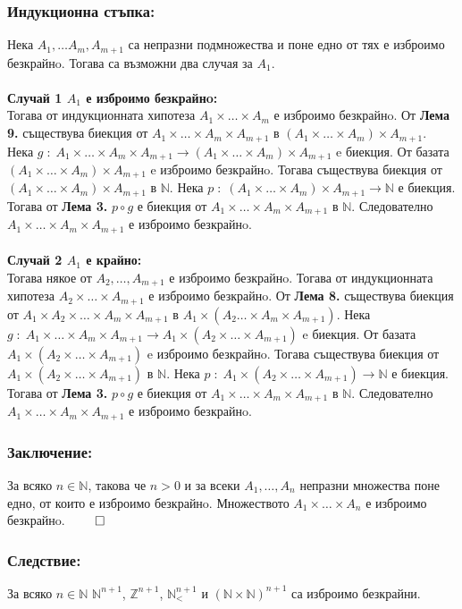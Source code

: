\documentclass[a4paper, 12pt, oneside]{article}
\newcommand{\N}{\mathbb{N}}
\newcommand{\Z}{\mathbb{Z}}
\newcommand{\LN}{\N_<}
\begin{document}
\subsubsection*{Индукционна стъпка:}
Нека \(A_1, \dots A_m, A_{m + 1}\) са непразни подмножества
и поне едно от тях е изброимо безкрайнo.
Тогава са възможни два случая за \(A_1\). \\
\hfill \\
\medskip
\textbf{Случай 1 \(A_1\) е изброимо безкрайнo:} \\
Тогава от индукционната хипотеза \(A_1 \times \dots \times A_m\) е изброимо безкрайнo.
От \textbf{Лема 9.} съществува биекция
от \(A_1 \times \dots \times A_m \times A_{m + 1}\) в \((A_1 \times \dots \times A_m) \times A_{m + 1}\). \\
Нека \(g \; : \; A_1 \times \dots \times A_m \times A_{m + 1} \to (A_1 \times \dots \times A_m) \times A_{m + 1}\)
e биекция.
От базата \((A_1 \times \dots \times A_m) \times A_{m + 1}\) e изброимо безкрайнo.
Тогава съществува биекция от \((A_1 \times \dots \times A_m) \times A_{m + 1}\) в \(\N\).
Нека \(p \; : \; (A_1 \times \dots \times A_m) \times A_{m + 1} \to \N\) е биекция.
Тогава от \textbf{Лема 3.} \(p \circ g\) е биекция
от \(A_1 \times \dots \times A_m \times A_{m + 1}\) в \(\N\).
Следователно \(A_1 \times \dots \times A_m \times A_{m + 1}\) е изброимо безкрайнo. \\
\hfill \\
\medskip
\textbf{Случай 2 \(A_1\) е крайно:} \\
Тогава някое от \(A_2, \dots, A_{m + 1}\) е изброимо безкрайнo.
Тогава от индукционната хипотеза \(A_2 \times \dots \times A_{m + 1}\) е изброимо безкрайнo.
От \textbf{Лема 8.} съществува биекция
от \(A_1 \times A_2 \times \dots \times A_m \times A_{m + 1}\)
в \(A_1 \times (A_2 \dots \times A_m \times A_{m + 1})\).
Нека \(g \; : \; A_1 \times \dots \times A_m \times A_{m + 1} \to A_1 \times (A_2 \times \dots \times A_{m + 1})\)
e биекция.
От базата \(A_1 \times (A_2 \times \dots \times A_{m + 1})\) e изброимо безкрайнo.
Тогава съществува биекция от \(A_1 \times (A_2 \times \dots \times A_{m + 1})\) в \(\N\).
Нека \(p \; : \; A_1 \times (A_2 \times \dots \times A_{m + 1}) \to \N\) е биекция.
Тогава от \textbf{Лема 3.} \(p \circ g\) е биекция
от \(A_1 \times \dots \times A_m \times A_{m + 1}\) в \(\N\).
Следователно \(A_1 \times \dots \times A_m \times A_{m + 1}\) е изброимо безкрайнo.
\subsubsection*{Заключение:}
За всяко \(n \in \N\), такова че \(n > 0\) и за всеки \(A_1, \dots, A_n\) непразни множества
поне едно, от които е изброимо безкрайнo.
Множеството \(A_1 \times \dots \times A_n\) е изброимо безкрайнo. \(\qed\)
\subsubsection*{Следствие:}
За всяко \(n \in \N\) \(\N^{n + 1}\), \(\Z^{n + 1}\), \(\LN^{n + 1}\) и \((\N \times \N)^{n + 1}\) са изброимо безкрайни.
\end{document}
